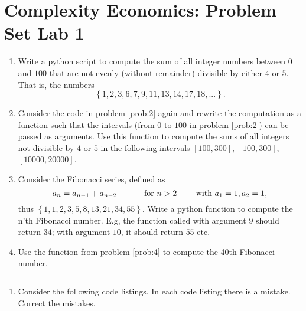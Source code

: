 \documentclass[25pt,a4paper]{article}
\begin{document}
\setlength{\emergencystretch}{0.5cm}
\pagestyle{empty}
\newcommand{\thegroup}{3}
\newcommand{\ifcasewrapper}[1]
{\ifcase#1\relax\or 
    \newcommand{\theothergroup}{2} %
\or 
    \newcommand{\theothergroup}{1} %
\or 
    \newcommand{\theothergroup}{4} %
\or 
    \newcommand{\theothergroup}{3} %
\fi
}
\ifcasewrapper{\thegroup}
\section*{Complexity Economics: Problem Set Lab 1}


\begin{enumerate}
  \item \label{prob:2} Write a python script to compute the sum of all integer numbers between $0$ and $100$ that are not evenly (without remainder) divisible by either $4$ or $5$. That is, the numbers $$\left\{1, 2, 3, 6, 7, 9, 11, 13, 14, 17, 18, ...\right\}.$$ %
  \item Consider the code in problem \ref{prob:2} again and rewrite the computation as a function such that the intervals (from $0$ to $100$ in problem \ref{prob:2}) can be passed as arguments. Use this function to compute the sums of all integers not divisible by $4$ or $5$ in the following intervals $\left[100, 300\right]$, $\left[100, 300\right]$, $\left[10000, 20000\right]$. %
  \item \label{prob:4} Consider the Fibonacci series, defined as 
  $$a_n = a_{n-1} + a_{n-2} \quad\quad\quad \textup{ for } n>2 \quad\quad \textup{ with } a_1=1, a_2=1,$$
  thus $\left\{1, 1, 2, 3, 5, 8, 13, 21, 34, 55\right\}$.
  Write a python function to compute the n'th Fibonacci number. E.g, the function called with argument $9$ should return $34$; with argument $10$, it should return $55$ etc.
  \item \label{prob:5} Use the function from problem \ref{prob:4} to compute the 40th Fibonacci number. %
\setcounter{counter1}{\value{enumi}}
\end{enumerate}

$$$$
$$$$
$$$$


\begin{enumerate}
\setcounter{enumi}{\value{counter1}}
  \item \label{prob:1} Consider the following code listings. In each code listing there is a mistake. Correct the mistakes.
\setcounter{counter1}{\value{enumi}}
\end{enumerate}
\end{document}
